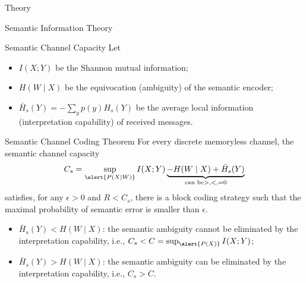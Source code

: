 \documentclass[presentation,mathserif,9pt]{beamer}
\begin{document}
\begin{section}{Theory}
\begin{subsection}{Semantic Information Theory}
		\begin{frame}{Semantic Channel Capacity}
			Let
			\begin{itemize}
				\item $I(X;Y)$ be the Shannon mutual information;
				\item $H(W \mid X)$ be the equivocation (ambiguity) of the semantic encoder;
				\item $\bar{H}_s(Y)=-\sum_{y}p(y)H_s(Y)$ be the average local information (interpretation capability) of received messages.
			\end{itemize}
			\begin{alertblock}{Semantic Channel Coding Theorem}
				For every discrete memoryless channel, the {\color{blue} semantic channel capacity}
				\begin{equation}
					C_s = \sup_{\alert{P(X \mid W)}} I(X;Y) \underbrace{- H(W \mid X) + \bar{H}_s(Y)}_{\text{can be} >, <, = 0}
				\end{equation}
				satisfies, for any $\epsilon > 0$ and $R < C_s$, there is a block coding strategy such that the maximal probability of semantic error is smaller than $\epsilon$.
				\begin{itemize}
					\item $\bar{H}_s(Y) < H(W \mid X)$: the semantic ambiguity cannot be eliminated by the interpretation capability, i.e., $C_s < C = \sup_{\alert{P(X)}}I(X;Y)$;
					\item $\bar{H}_s(Y) > H(W \mid X)$: the semantic ambiguity can be eliminated by the interpretation capability, i.e., $C_s > C$.
				\end{itemize}
			\end{alertblock}
		\end{frame}
	\end{subsection}
\end{section}
\end{document}
